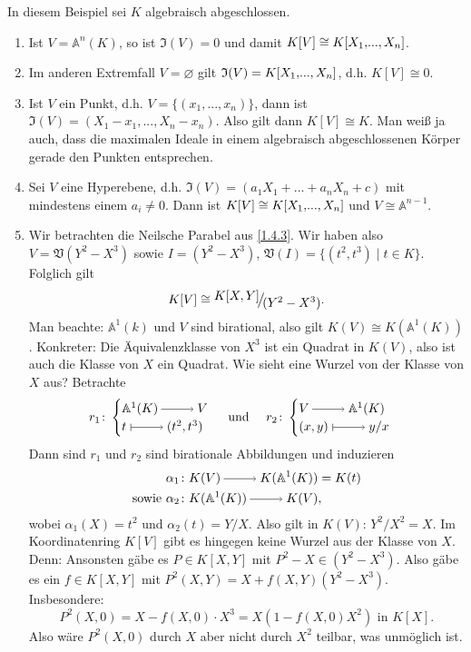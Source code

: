 \documentclass[a4paper,12pt]{scrbook}
\def\A{\mathbb{A}}
\def\V{\mathfrak{V}}
\def\I{\mathfrak{I}}
\newcommand{\leer}{\ensuremath{\varnothing}}
\renewcommand{\dotsc}{\ensuremath{\!...}}
\newcommand{\ra}{\raisebox{-1pt}{\tikz{\draw[thin,shorten >=3pt, ->] (0,0) node{\hspace*{-2pt}} -- node{} (1,0);}}\penalty1000\relax}
\renewcommand{\mapsto}{\raisebox{-1pt}{\tikz{\draw[thin,shorten >=3pt, |->] (0,0) node{\hspace*{0pt}} -- node{} (1,0);}}\penalty1000\relax}
\newcommand{\Quotient}[2]{
  \mathchoice
  { %
    \raisebox{0.7ex}{\ensuremath{#1}}
    \ensuremath{\mkern-3mu}\big/\ensuremath{\mkern-3mu}
    \raisebox{-0.6ex}{\ensuremath{#2}}
  }
  { %
    #1/#2
  }
  { %
    #1/#2
  }
  { %
    #1/#2
  }
}
\newcommand{\polyx}[1][n]{\ensuremath%
  [X_{1},\dotsc,X_{#1}]}
\begin{document}
\begin{bsp}\label{1.4.8} In diesem Beispiel sei $K$ algebraisch abgeschlossen.
\begin{enumerate}
\item{} Ist $V=\A^n(K)$, so ist $\I(V)=0$ und damit $K[V]\cong K\polyx$.
\item{} Im anderen Extremfall $V=\leer$ gilt $\I(V)=K\polyx$, d.h. $K[V]\cong 0$.
\item{} Ist $V$ ein Punkt, d.h. $V=\{(x_1,\dotsc,x_n)\}$, dann ist $\I(V)=(X_1-x_1,\dotsc,X_n-x_n)$. Also gilt dann $K[V]\cong K$. Man weiß ja auch, dass die maximalen Ideale in einem algebraisch abgeschlossenen Körper gerade den Punkten entsprechen.
\item{} Sei $V$ eine Hyperebene, d.h. $\I(V)=(a_1X_1+\dotsc+a_nX_n+c)$ mit mindestens einem $a_i\neq 0$.
Dann ist $K[V]\cong K\polyx$ und $V\cong \A^{n-1}$.
\item{} Wir betrachten die Neilsche Parabel aus \cref{1.4.3}. Wir haben also $V=\V(Y^2-X^3)$ sowie $I=(Y^2-X^3)$,
  $\V(I)=\{(t^2,t^3) \mid t\in K\}$. Folglich gilt
\[K[V]\cong \Quotient{K[X,Y]}{(Y^2-X^3)}.\] 
Man beachte: $\A^1(k)$ und $V$ sind birational, also gilt $K(V)\cong K(\A^1(K))$. Konkreter:
Die Äquivalenzklasse von $X^3$ ist ein Quadrat in $K(V)$, also ist auch die Klasse von $X$ ein Quadrat.
Wie sieht eine Wurzel von der Klasse von $X$ aus? Betrachte  
\[r_1\colon  \begin{cases} \A^1(K)\ra V \\ t\mapsto (t^2,t^3) \end{cases} \text{ und \quad  } r_2\colon  \begin{cases} V\ra \A^1(K) \\ (x,y) \mapsto y/x\end{cases}\]
Dann sind $r_1$ und $r_2$ sind birationale Abbildungen und induzieren 
\begin{align*}&\alpha_1\colon  K(V)\ra K(\A^1(K))=K(t)\\
\text{sowie }&\alpha_2\colon  K(\A^1(K))\ra K(V),\end{align*}
wobei $\alpha_1(X)=t^2$ und $\alpha_2(t)=Y/X$. Also gilt in $K(V)$: $Y^2/X^2=X$.
Im Koordinatenring $K[V]$ gibt es hingegen keine Wurzel aus der Klasse von $X$. Denn:
Ansonsten gäbe es $P \in K[X,Y]$ mit $P^2-X \in (Y^2-X^3)$. Also gäbe es ein $f \in K[X,Y]$ mit $P^2(X,Y)=X+f(X,Y)(Y^2-X^3)$.
Insbesondere:
 \[P^2(X,0)=X-f(X,0)\cdot X^3=X(1-f(X,0)X^2)\text{ in } K[X].\]
 Also wäre $P^2(X,0)$ durch $X$ aber nicht durch $X^2$ teilbar, was unmöglich ist.
\end{enumerate}
\end{bsp}
\end{document}
